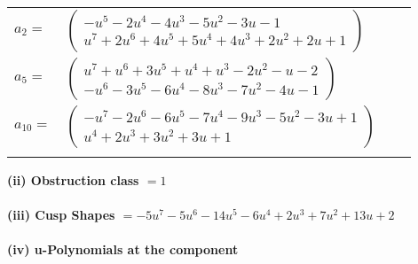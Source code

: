\documentclass[1p]{elsarticle_modified}
\theoremstyle{definition}
\begin{document}
\begin{tabular}{m{7pt} m{180pt} m{7pt} m{180pt} }
\flushright $a_{2}=$&$\begin{pmatrix}- u^5-2 u^4-4 u^3-5 u^2-3 u-1\\u^7+2 u^6+4 u^5+5 u^4+4 u^3+2 u^2+2 u+1\end{pmatrix}$ \\
\flushright $a_{5}=$&$\begin{pmatrix}u^7+u^6+3 u^5+u^4+u^3-2 u^2- u-2\\- u^6-3 u^5-6 u^4-8 u^3-7 u^2-4 u-1\end{pmatrix}$ \\
\flushright $a_{10}=$&$\begin{pmatrix}- u^7-2 u^6-6 u^5-7 u^4-9 u^3-5 u^2-3 u+1\\u^4+2 u^3+3 u^2+3 u+1\end{pmatrix}$\\&\end{tabular}
\flushleft \textbf{(ii) Obstruction class $= 1$}\\~\\
\flushleft \textbf{(iii) Cusp Shapes $= -5 u^7-5 u^6-14 u^5-6 u^4+2 u^3+7 u^2+13 u+2$}\\~\\
\newpage\renewcommand{\arraystretch}{1}
\flushleft \textbf{(iv) u-Polynomials at the component}\newline \\
\end{document}
